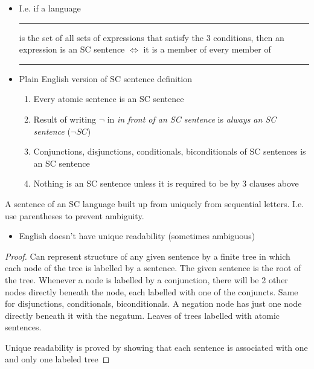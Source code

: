 \begin{itemize}
	\item I.e. if a language \rule{1cm}{0.15mm} is the set of all sets of
	      expressions that satisfy the 3 conditions,
	      then an expression is an SC sentence $\iff$ it is a member of every
	      member
	      of \rule{1cm}{0.15mm}
	\item Plain English version of SC sentence definition
	      \begin{enumerate}
		      \item Every atomic sentence is an SC sentence
		      \item Result of writing $\lnot$ in \textit{in front of an SC
			            sentence} is \textit{always an SC sentence} ($\lnot SC$)
		      \item Conjunctions, disjunctions, conditionals,
		            biconditionals of SC
		            sentences is an SC sentence
		      \item Nothing is an SC sentence unless it is required to be
		            by 3 clauses above
	      \end{enumerate}
\end{itemize}

\begin{theorem}
	A sentence of an SC language built up from uniquely from sequential letters. I.e.
	use parentheses to prevent ambiguity.
\end{theorem}
\begin{itemize}
	\item English doesn't have unique readability (sometimes ambiguous)
\end{itemize}
\begin{proof}
	Can represent structure of any given sentence by a finite tree in which each
	node of the tree is labelled by a sentence. The given sentence is the root of
	the tree. Whenever a node is labelled by a conjunction, there will be 2 other
	nodes directly beneath the node, each labelled with one of the conjuncts. Same
	for disjunctions, conditionals, biconditionals. A negation node has just one
	node directly beneath it with the negatum.
	Leaves of trees labelled with atomic sentences.

	Unique readability is proved by showing that each sentence is associated
	with one and only one labeled tree
\end{proof}

